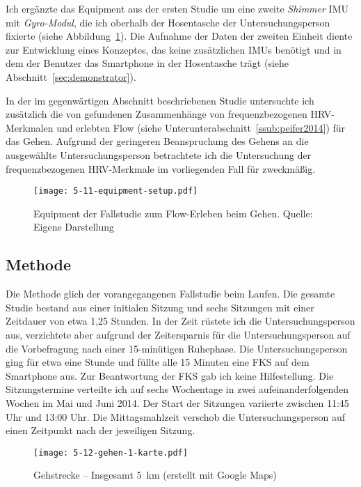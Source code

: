 Ich ergänzte das Equipment aus der ersten Studie um eine zweite \emph{Shimmer} \ac{IMU} mit \emph{Gyro-Modul}, die ich oberhalb der Hosentasche der Untersuchungsperson fixierte (siehe Abbildung~\ref{fig:5_11_equipment_setup}). Die Aufnahme der Daten der zweiten Einheit diente zur Entwicklung eines Konzeptes, das keine zusätzlichen \acp{IMU} benötigt und in dem der Benutzer das Smartphone in der Hosentasche trägt (siehe Abschnitt~\ref{sec:demonstrator}).

In der im gegenwärtigen Abschnitt beschriebenen Studie untersuchte ich zusätzlich die von \citet{Peifer2014} gefundenen Zusammenhänge von frequenzbezogenen \ac{HRV}-Merkmalen und erlebten Flow (siehe Unterunterabschnitt~\ref{ssub:peifer2014}) für das Gehen. Aufgrund der geringeren Beanspruchung des Gehens an die ausgewählte Untersuchungsperson betrachtete ich die Untersuchung der frequenzbezogenen \ac{HRV}-Merkmale im vorliegenden Fall für zweckmäßig.

\begin{figure}[t]
	\centering
		\texttt{[image: 5-11-equipment-setup.pdf]}
	\caption[Equipment der Fallstudie zum Flow-Erleben beim Gehen]{Equipment der Fallstudie zum Flow-Erleben beim Gehen. Quelle: Eigene Darstellung}
	\label{fig:5_11_equipment_setup}
\end{figure}

\subsection{Methode}
Die Methode glich der vorangegangenen Fallstudie beim Laufen. Die gesamte Studie bestand aus einer initialen Sitzung und sechs Sitzungen mit einer Zeitdauer von etwa 1,25 Stunden. In der Zeit rüstete ich die Untersuchungsperson aus, verzichtete aber aufgrund der Zeitersparnis für die Untersuchungsperson auf die Vorbefragung nach einer 15-minütigen Ruhephase. Die Untersuchungsperson ging für etwa eine Stunde und füllte alle 15 Minuten eine \ac{FKS} auf dem Smartphone aus. Zur Beantwortung der \ac{FKS} gab ich keine Hilfestellung. Die Sitzungstermine verteilte ich auf sechs Wochentage in zwei aufeinanderfolgenden Wochen im Mai und Juni 2014. Der Start der Sitzungen variierte zwischen 11:45 Uhr und 13:00 Uhr. Die Mittagsmahlzeit verschob die Untersuchungsperson auf einen Zeitpunkt nach der jeweiligen Sitzung.

\begin{figure}[t]
	\centering
		\texttt{[image: 5-12-gehen-1-karte.pdf]}
	\caption[Gehstrecke]{Gehstrecke -- Insgesamt 5~km (erstellt mit Google Maps)}
	\label{fig:5-12-gehen-1-karte}
\end{figure}

